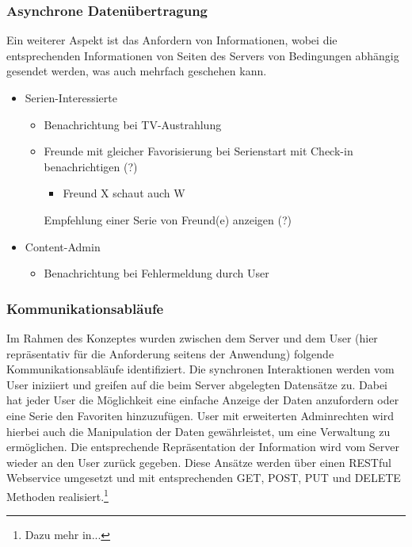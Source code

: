\documentclass[a4paper]{article}
\begin{document}
\subsubsection{Asynchrone Datenübertragung}

Ein weiterer Aspekt ist das Anfordern von Informationen, wobei die entsprechenden Informationen von Seiten des Servers von Bedingungen abhängig gesendet werden, was auch mehrfach geschehen kann.

\begin{itemize}
\item
Serien-Interessierte
	\begin{itemize}
	\item
    Benachrichtung bei TV-Austrahlung
    \item
    Freunde mit gleicher Favorisierung bei Serienstart mit Check-in benachrichtigen (?)
	    \begin{itemize}
	    \item
         Freund X schaut auch W
         \end{itemize}
    Empfehlung einer Serie von Freund(e) anzeigen (?)
    \end{itemize}
\item
Content-Admin
	\begin{itemize}
	\item
    Benachrichtung bei Fehlermeldung durch User
    \end{itemize}
\end{itemize}

\subsubsection{Kommunikationsabläufe}
Im Rahmen des Konzeptes wurden zwischen dem Server und dem User (hier repräsentativ für die Anforderung seitens der Anwendung) folgende Kommunikationsabläufe identifiziert.
Die synchronen Interaktionen werden vom User iniziiert und greifen auf die beim Server abgelegten Datensätze zu. Dabei hat jeder User die Möglichkeit eine einfache Anzeige der Daten anzufordern oder eine Serie den Favoriten hinzuzufügen. User mit erweiterten Adminrechten wird hierbei auch die Manipulation der Daten gewährleistet, um eine Verwaltung zu ermöglichen. Die entsprechende Repräsentation der Information wird vom Server wieder an den User zurück gegeben. 
Diese Ansätze werden über einen RESTful Webservice umgesetzt und mit entsprechenden GET, POST, PUT und DELETE Methoden realisiert.\footnote[2]{Dazu mehr in...}
\end{document}
